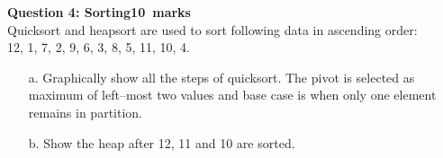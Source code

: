 \documentclass[12pt,a4paper]{article}
\def\Qfour{10}
\begin{document}
%
%
%
%		
\noindent\textbf{Question 4: Sorting\hfill \Qfour~marks}\\
Quicksort and heapsort are used to sort following data in ascending order:\\12, 1, 7, 2, 9, 6, 3, 8, 5, 11, 10, 4.
\begin{itemize}
\item[a.] Graphically show all the steps of quicksort. The pivot is selected as maximum of left--most two values and base case is when only one element remains in partition.\newpage
\item[b.] Show the heap after 12, 11 and 10 are sorted.
\end{itemize}
%
\end{document}
